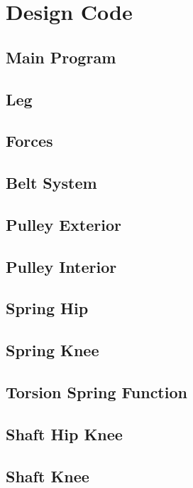 \section{Design Code}

\subsection{Main Program}

\subsection{Leg}

\subsection{Forces}

\subsection{Belt System}

\subsection{Pulley Exterior}

\subsection{Pulley Interior}

\subsection{Spring Hip}

\subsection{Spring Knee}

\subsection{Torsion Spring Function}

\subsection{Shaft Hip Knee}

\subsection{Shaft Knee}

